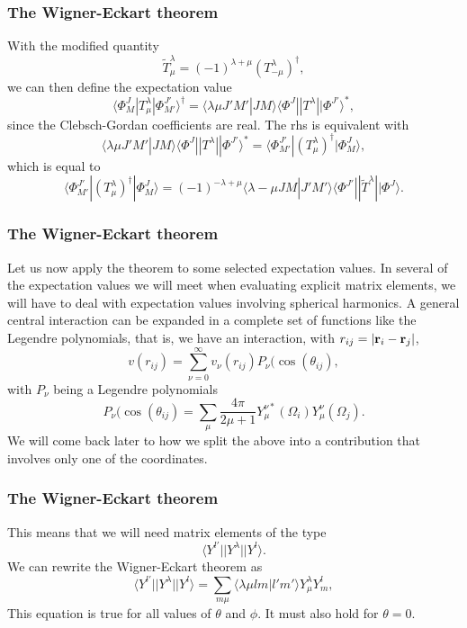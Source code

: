 \documentclass[compress]{beamer}
\begin{document}
\frame
{
\frametitle{The Wigner-Eckart theorem}
\begin{small}
{\scriptsize

With the modified quantity 
\[
\tilde{T}^{\lambda}_{\mu}=(-1)^{\lambda+\mu}(T^{\lambda}_{-\mu})^{\dagger},
\]
we can then define the expectation value
\[
\langle \Phi^J_M|T^{\lambda}_{\mu}|\Phi^{J'}_{M'}\rangle^{\dagger} = \langle \lambda \mu J'M'|JM\rangle\langle \Phi^J||T^{\lambda}||\Phi^{J'}\rangle^*,
\]
since the Clebsch-Gordan coefficients are real. The rhs is equivalent with 
\[
\langle \lambda \mu J'M'|JM\rangle\langle \Phi^J||T^{\lambda}||\Phi^{J'}\rangle^*=\langle \Phi^{J'}_{M'}|(T^{\lambda}_{\mu})^{\dagger}|\Phi^{J}_{M}\rangle,
\]
which is equal to 
\[
\langle \Phi^{J'}_{M'}|(T^{\lambda}_{\mu})^{\dagger}|\Phi^{J}_{M}\rangle=(-1)^{-\lambda+\mu}\langle \lambda -\mu JM|J'M'\rangle\langle \Phi^{J'}||\tilde{T}^{\lambda}||\Phi^{J}\rangle.
\]
}
\end{small}
}


\frame
{
\frametitle{The Wigner-Eckart theorem}
\begin{small}
{\scriptsize


Let us now apply the theorem to some selected expectation values.
In several of the expectation values we will meet when evaluating explicit matrix elements, we will have to deal with expectation values involving spherical harmonics. A general central interaction can be expanded in a complete set of functions like the Legendre polynomials, that is, we have an interaction, with $r_{ij}=|{\bf r}_i-{\bf r}_j|$,
\[
v(r_{ij})=\sum_{\nu=0}^{\infty}v_{\nu}(r_{ij})P_{\nu}(\cos{(\theta_{ij})},
\]
with $P_{\nu}$ being a Legendre polynomials
\[
P_{\nu}(\cos{(\theta_{ij})}=\sum_{\mu}\frac{4\pi}{2\mu+1}Y_{\mu}^{\nu *}(\Omega_{i})Y_{\mu}^{\nu}(\Omega_{j}).
\]
We will come back later to how we split the above into a contribution that involves only one of the coordinates.
}
\end{small}
}




\frame
{
\frametitle{The Wigner-Eckart theorem}
\begin{small}
{\scriptsize
This means that we will need matrix elements of the type
\[
\langle Y^{l'}||Y^{\lambda}|| Y^{l}\rangle.
\]
We can rewrite the Wigner-Eckart theorem as 
\[
\langle Y^{l'}||Y^{\lambda}|| Y^{l}\rangle=\sum_{m\mu}\langle \lambda\mu lm|l'm'\rangle Y^{\lambda}_{\mu}Y^l_m,
\]
This equation is true for all values of $\theta$ and $\phi$. It must also hold for $\theta=0$.
}
\end{small}

}
\end{document}

